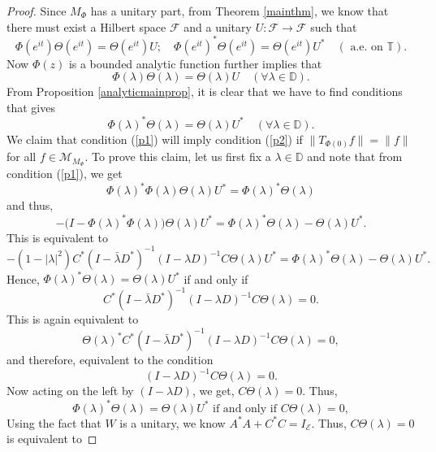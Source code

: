 \documentclass[12pt]{amsart}
\numberwithin{equation}{section}
\theoremstyle{definition}
\newcommand{\D}{\mathbb{D}}
\newcommand{\T}{\mathbb{T}}
\newcommand{\1}{{\mbox{\bf 1}}}
\newcommand{\clb}{\mathcal{B}}
\newcommand{\cle}{\mathcal{E}}
\newcommand{\clf}{\mathcal{F}}
\newcommand{\clm}{\mathcal{M}}
\newcommand{\raro}{\rightarrow}
\begin{document}
\begin{proof}
Since $M_{\Phi}$ has a unitary part, from Theorem \ref{mainthm}, we know that there must exist a Hilbert space $\clf$ and a unitary $U:\clf \raro \clf$ such that
\[
\Phi(e^{it}) \Theta(e^{it}) = \Theta(e^{it}) U; \quad \Phi(e^{it})^* \Theta(e^{it}) = \Theta(e^{it}) U^* \quad (\text{ a.e.  on } \T).
\]
Now $\Phi(z)$ is a bounded analytic function further implies that 
\begin{equation}\label{p1}
\Phi(\lambda) \Theta(\lambda) = \Theta(\lambda) U \quad (\forall \lambda \in \D).
\end{equation}
From Proposition \ref{analyticmainprop}, it is clear that we have to find conditions that gives 
\begin{equation}\label{p2}
\Phi(\lambda)^* \Theta(\lambda) = \Theta(\lambda) U^* \quad (\forall \lambda \in \D).
\end{equation}
We claim that condition (\ref{p1}) will imply condition (\ref{p2}) if $\|T_{\Phi(0)} f\| = \|f\|$ for all $f \in \clm_{M_{\Phi}}$.  To prove this claim, let us first fix a $\lambda \in \D$ and note that from condition (\ref{p1}), we get
\[
\Phi(\lambda)^* \Phi(\lambda) \Theta(\lambda)U^* = \Phi(\lambda)^* \Theta(\lambda)
\]
and thus, 
\[
- \big(I - \Phi(\lambda)^* \Phi(\lambda) \big) \Theta(\lambda)U^*  = \Phi(\lambda)^* \Theta(\lambda) - \Theta(\lambda)U^*.
\]
This is equivalent to
\[
- (1 - |\lambda|^2) C^* (I - \bar{\lambda} D^*)^{-1}  (I - \lambda D)^{-1}C\Theta(\lambda)U^* = \Phi(\lambda)^* \Theta(\lambda) - \Theta(\lambda)U^*.
\]
Hence, $ \Phi(\lambda)^* \Theta(\lambda) = \Theta(\lambda)U^*$ if and only if 
\[
C^* (I - \bar{\lambda} D^*)^{-1}  (I - \lambda D)^{-1}C\Theta(\lambda)=0.
\]
This is again equivalent to 
\[
\Theta(\lambda)^* C^* (I - \bar{\lambda} D^*)^{-1}  (I - \lambda D)^{-1}C\Theta(\lambda)=0,
\]
and therefore, equivalent to the condition 
\[
(I - \lambda D)^{-1}C\Theta(\lambda)=0.
\]
Now acting on the left by $(I - \lambda D)$, we get, $C\Theta(\lambda)=0$. Thus, 
\[
\Phi(\lambda)^* \Theta(\lambda) = \Theta(\lambda)U^* \text{ if and only if }C \Theta(\lambda) = 0,
\] 
Using the fact that $W$ is a unitary, we know $A^*A + C^* C = I_{\cle}$. Thus, $C \Theta(\lambda) = 0$ is equivalent to

\end{proof}
\end{document}

